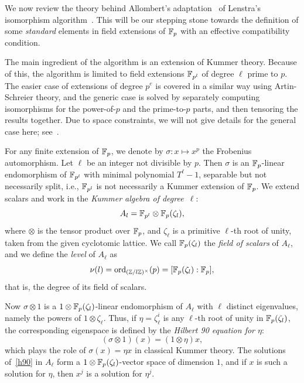 \documentclass[sigconf]{acmart}
\begin{document}
We now review the theory behind Allombert's
adaptation~\cite{Allombert02} of Lenstra's isomorphism
algorithm~\cite{LenstraJr91}. %
This will be our stepping stone towards the definition of some
\emph{standard} elements in field extensions of $\mathbb{F}_p$ with an
effective compatibility condition.

The main ingredient of the algorithm is an extension of Kummer
theory. %
Because of this, the algorithm is limited to field extensions
$\mathbb{F}_{p^l}$ of degree $\ell$ prime to $p$. %
The easier case of extensions of degree $p^e$ is covered in a similar
way using Artin-Schreier theory, and the generic case is solved by
separately computing isomorphisms for the power-of-$p$ and the
prime-to-$p$ parts, and then tensoring the results together. %
Due to space constraints, we will not give details for the general
case here; see~\cite{LenstraJr91,Allombert02,brieulle2018computing}.

For any finite extension of $\mathbb{F}_{p}$, we denote by $ \sigma:x\mapsto x^p $
the Frobenius automorphism.
Let $\ell$ be an integer not divisible by $p$.
Then $\sigma$ is an $\mathbb{F}_{p}$-linear endomorphism of $\mathbb{F}_{p^l}$
with minimal polynomial $T^\ell-1$, separable but not necessarily split,
i.e., $\mathbb{F}_{p^l}$ is not necessarily a Kummer extension of $\mathbb{F}_{p}$.
We extend scalars and work in the
\emph{Kummer algebra of degree~$\ell$}:
\[
  A_l = \mathbb{F}_{p^l}\otimes\mathbb{F}_{p}(\zeta_l),
\]
where $\otimes$ is the tensor product over $\mathbb{F}_{p}$, and $\zeta_\ell$ is a primitive
$\ell$-th root of unity, taken from the given cyclotomic lattice. We
call $\mathbb{F}_{p}(\zeta_l)$ the \emph{field of scalars} of $A_\ell$, and
we define the \emph{level} of $A_\ell$ as
\[
  \nu(l) = \mathrm{ord}_{(\mathbb{Z}/l\mathbb{Z})^\times}(p) = [\mathbb{F}_{p}(\zeta_l):\mathbb{F}_{p}],
\]
that is, the degree of its field of scalars.

Now $\sigma\otimes1$ is a $1\otimes\mathbb{F}_{p}(\zeta_l)$-linear endomorphism of $A_\ell$
with $\ell$ distinct eigenvalues, namely the powers of $1\otimes\zeta_\ell$.
Thus, if $\eta=\zeta_\ell^i$ is any $\ell$-th root of unity in $\mathbb{F}_{p}(\zeta_l)$,
the corresponding eigenspace is defined by the \emph{Hilbert 90 equation for $\eta$}:
\begin{equation}
  \tag{H90}
 (\sigma\otimes1)(x) = (1\otimes\eta)x,
  \label{h90}
\end{equation}
which plays the role of $\sigma(x)=\eta x$ in classical Kummer theory.
The solutions of~\eqref{h90} in $A_\ell$ form a
$1\otimes\mathbb{F}_{p}(\zeta_{l})$-vector space of dimension $1$,
and if $x$ is such a solution for $\eta$, then $x^j$ is a solution for $\eta^j$.
\end{document}

